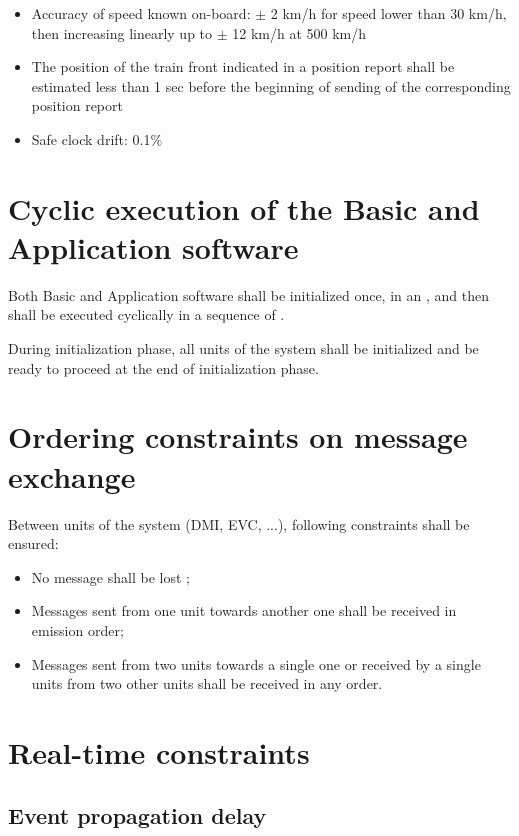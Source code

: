 \begin{itemize}
\item Accuracy of speed known on-board: $\pm$ 2 km/h for speed lower
  than 30 km/h, then increasing linearly up to $\pm$ 12 km/h at 500 km/h

\item The position of the train front indicated in a position report
  shall be estimated less than 1 sec before the beginning of sending
  of the corresponding position report

\item Safe clock drift: 0.1\%

\end{itemize}

\section{Cyclic execution of the Basic and Application software}

Both Basic and Application software shall be initialized once, in an
, and then shall be executed cyclically
in a sequence of .

During initialization phase, all units of the system shall be
initialized and be ready to proceed at the end of initialization
phase.

\section{Ordering constraints on message exchange}
\label{sec:ordering-constraints}

Between units of the system (DMI, EVC, ...), following constraints
shall be ensured:
\begin{itemize}
\item No message shall be lost ;
\item Messages sent from one unit towards another one shall be
  received in emission order;
\item Messages sent from two units towards a
single one or received by a single units from two other units shall be
received in any order.
\end{itemize}

\section{Real-time constraints}

\subsection{Event propagation delay}
\label{sec:event-propagation-delay}

